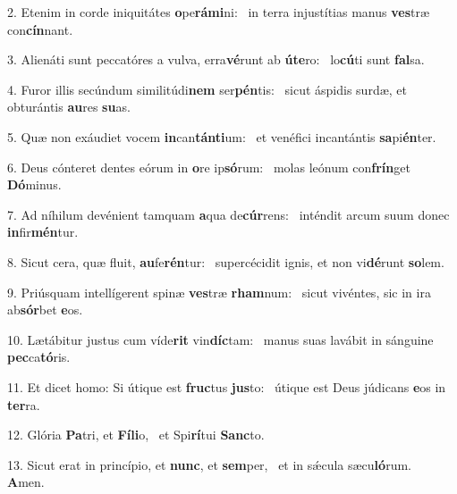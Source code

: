2. Etenim in corde iniquitátes \textbf{o}pe\textbf{rá}\textbf{mi}ni: \ast\  in terra injustítias manus \textbf{ves}træ con\textbf{cín}nant.\

3. Alienáti sunt peccatóres a vulva, erra\textbf{vé}runt ab \textbf{ú}\textbf{te}ro: \ast\  lo\textbf{cú}ti sunt \textbf{fal}sa.\

4. Furor illis secúndum similitúdi\textbf{nem} ser\textbf{pén}tis: \ast\  sicut áspidis surdæ, et obturántis \textbf{au}res \textbf{su}as.\

5. Quæ non exáudiet vocem \textbf{in}can\textbf{tán}\textbf{ti}um: \ast\  et venéfici incantántis \textbf{sa}pi\textbf{én}ter.\

6. Deus cónteret dentes eórum in \textbf{o}re ip\textbf{só}rum: \ast\  molas leónum con\textbf{frín}get \textbf{Dó}minus.\

7. Ad níhilum devénient tamquam \textbf{a}qua de\textbf{cúr}rens: \ast\  inténdit arcum suum donec \textbf{in}fir\textbf{mén}tur.\

8. Sicut cera, quæ fluit, \textbf{au}fe\textbf{rén}tur: \ast\  supercécidit ignis, et non vi\textbf{dé}runt \textbf{so}lem.\

9. Priúsquam intellígerent spinæ \textbf{ves}træ \textbf{rham}num: \ast\  sicut vivéntes, sic in ira ab\textbf{sór}bet \textbf{e}os.\

10. Lætábitur justus cum víde\textbf{rit} vin\textbf{díc}tam: \ast\  manus suas lavábit in sánguine \textbf{pec}ca\textbf{tó}ris.\

11. Et dicet homo: Si útique est \textbf{fruc}tus \textbf{jus}to: \ast\  útique est Deus júdicans \textbf{e}os in \textbf{ter}ra.\

12. Glória \textbf{Pa}tri, et \textbf{Fí}\textbf{li}o, \ast\  et Spi\textbf{rí}tui \textbf{Sanc}to.\

13. Sicut erat in princípio, et \textbf{nunc}, et \textbf{sem}per, \ast\  et in sǽcula sæcu\textbf{ló}rum. \textbf{A}men.\

